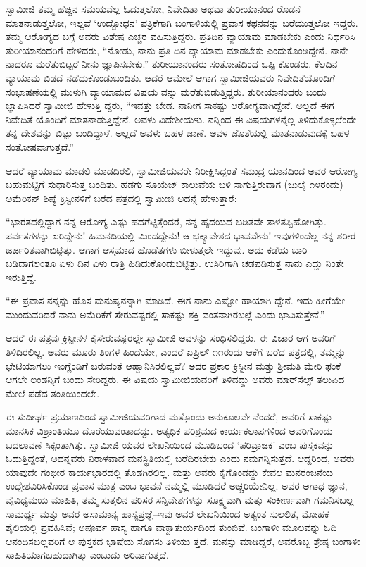ಸ್ವಾಮೀಜಿ ತಮ್ಮ ಹೆಚ್ಚಿನ ಸಮಯವೆಲ್ಲ ಓದುತ್ತಲೋ, ನಿವೇದಿತಾ ಅಥವಾ ತುರೀಯಾನಂದ ರೊಡನೆ ಮಾತನಾಡುತ್ತಲೋ, ಇಲ್ಲವೆ ‘ಉದ್ಬೋಧನ’ ಪತ್ರಿಕೆಗಾಗಿ ಬಂಗಾಳಿಯಲ್ಲಿ ಪ್ರವಾಸ ಕಥನವನ್ನು ಬರೆಯುತ್ತಲೋ ಇದ್ದರು. ತಮ್ಮ ಆರೋಗ್ಯದ ಬಗ್ಗೆ ಅವರು ವಿಶೇಷ ಎಚ್ಚರ ವಹಿಸುತ್ತಿದ್ದರು. ಪ್ರತಿದಿನ ವ್ಯಾಯಾಮ ಮಾಡಬೇಕು ಎಂದು ನಿರ್ಧರಿಸಿ ತುರೀಯಾನಂದರಿಗೆ ಹೇಳಿದರು, “ನೋಡು, ನಾನು ಪ್ರತಿ ದಿನ ವ್ಯಾಯಾಮ ಮಾಡಬೇಕು ಎಂದುಕೊಂಡಿದ್ದೇನೆ. ನಾನೇ ನಾದರೂ ಮರೆತುಬಿಟ್ಟರೆ ನೀನು ಜ್ಞಾಪಿಸಬೇಕು.” ತುರೀಯಾನಂದರು ಸಂತೋಷದಿಂದ ಒಪ್ಪಿ ಕೊಂಡರು. ಕೆಲದಿನ ವ್ಯಾಯಾಮ ಬಿಡದೆ ನಡೆದುಕೊಂಡುಬಂದಿತು. ಆದರೆ ಆಮೇಲೆ ಆಗಾಗ ಸ್ವಾಮೀಜಿಯವರು ನಿವೇದಿತೆಯೊಂದಿಗೆ ಸಂಭಾಷಣೆಯಲ್ಲಿ ಮುಳುಗಿ ವ್ಯಾಯಾಮದ ವಿಷಯ ವನ್ನು ಮರೆತುಬಿಡುತ್ತಿದ್ದರು. ತುರೀಯಾನಂದರು ಬಂದು ಜ್ಞಾಪಿಸಿದರೆ ಸ್ವಾಮೀಜಿ ಹೇಳುತ್ತಿ ದ್ದರು, “ಇವತ್ತು ಬೇಡ. ನಾನೀಗ ಸಾಕಷ್ಟು ಆರೋಗ್ಯವಾಗಿದ್ದೇನೆ. ಅಲ್ಲದೆ ಈಗ ನಿವೇದಿತೆ ಯೊಂದಿಗೆ ಮಾತನಾಡುತ್ತಿದ್ದೇನೆ. ಅವಳು ವಿದೇಶೀಯಳು. ನನ್ನಿಂದ ಈ ವಿಷಯಗಳನ್ನೆಲ್ಲ ತಿಳಿದುಕೊಳ್ಳಲೆಂದೇ ತನ್ನ ದೇಶವನ್ನು ಬಿಟ್ಟು ಬಂದಿದ್ದಾಳೆ. ಅಲ್ಲದೆ ಅವಳು ಬಹಳ ಜಾಣೆ. ಅವಳ ಜೊತೆಯಲ್ಲಿ ಮಾತನಾಡುವುದಕ್ಕೆ ಬಹಳ ಸಂತೋಷವಾಗುತ್ತದೆ.”

ಆದರೆ ವ್ಯಾಯಾಮ ಮಾಡಲಿ ಮಾಡದಿರಲಿ, ಸ್ವಾಮೀಜಿಯವರೇ ನಿರೀಕ್ಷಿಸಿದ್ದಂತೆ ಸಮುದ್ರ ಯಾನದಿಂದ ಅವರ ಆರೋಗ್ಯ ಬಹುಮಟ್ಟಿಗೆ ಸುಧಾರಿಸುತ್ತ ಬಂದಿತು. ಹಡಗು ಸೂಯೆಜ್ ಕಾಲುವೆಯ ಬಳಿ ಸಾಗುತ್ತಿರುವಾಗ (ಜುಲೈ ೧೪ರಂದು) ಅಮೆರಿಕನ್ ಶಿಷ್ಯೆ ಕ್ರಿಸ್ಟೀನಳಿಗೆ ಬರೆದ ಪತ್ರದಲ್ಲಿ ಸ್ವಾಮೀಜಿ ಅದನ್ನೆ ಹೇಳುತ್ತಾರೆ:

“ಭಾರತದಲ್ಲಿದ್ದಾಗ ನನ್ನ ಆರೋಗ್ಯ ಎಷ್ಟು ಹದಗೆಟ್ಟಿತ್ತೆಂದರೆ, ನನ್ನ ಹೃದಯದ ಬಡಿತವೇ ತಾಳತಪ್ಪಿಹೋಗಿತ್ತು. ಪರ್ವತಗಳನ್ನು ಏರಿದ್ದೇನು! ಹಿಮನದಿಯಲ್ಲಿ ಮಿಂದದ್ದೇನು! ಆ ಭಕ್ತ್ಯಾವೇಶದ ಭಾವವೇನು! ಇವುಗಳಿಂದೆಲ್ಲ ನನ್ನ ಶರೀರ ಜರ್ಜರಿತವಾಗಿಬಿಟ್ಟಿತ್ತು. ಆಗಾಗ ಆಸ್ತಮಾದ ಹೊಡೆತಗಳು ಬೀಳುತ್ತಲೇ ಇದ್ದುವು. ಅದು ಕಡೆಯ ಬಾರಿ ಬಡಿದಾಗಲಂತೂ ಏಳು ದಿನ ಏಳು ರಾತ್ರಿ ಹಿಡಿದುಕೊಂಡುಬಿಟ್ಟಿತ್ತು. ಉಸಿರಿಗಾಗಿ ಚಡಪಡಿಸುತ್ತ ನಾನು ಎದ್ದು ನಿಂತೇ ಇರುತ್ತಿದ್ದೆ.

“ಈ ಪ್ರವಾಸ ನನ್ನನ್ನು ಹೊಸ ಮನುಷ್ಯನನ್ನಾಗಿ ಮಾಡಿದೆ. ಈಗ ನಾನು ಎಷ್ಟೋ ಹಾಯಾಗಿ ದ್ದೇನೆ. ಇದು ಹೀಗೆಯೇ ಮುಂದುವರಿದರೆ ನಾನು ಅಮೆರಿಕೆಗೆ ಸೇರುವಷ್ಟರಲ್ಲಿ ಸಾಕಷ್ಟು ಶಕ್ತಿ ವಂತನಾಗಿರಬಲ್ಲೆ ಎಂದು ಭಾವಿಸುತ್ತೇನೆ.”

ಆದರೆ ಈ ಪತ್ರವು ಕ್ರಿಸ್ಟೀನಳ ಕೈಸೇರುವಷ್ಟರಲ್ಲೇ ಸ್ವಾಮೀಜಿ ಅವಳನ್ನು ಸಂಧಿಸಲಿದ್ದರು. ಈ ವಿಚಾರ ಆಗ ಅವರಿಗೆ ತಿಳಿದಿರಲಿಲ್ಲ. ಅವರು ಮೂರು ತಿಂಗಳ ಹಿಂದೆಯೇ, ಎಂದರೆ ಏಪ್ರಿಲ್ ೧೧ರಂದು ಆಕೆಗೆ ಬರೆದ ಪತ್ರದಲ್ಲಿ, ತಮ್ಮನ್ನು ಭೇಟಿಯಾಗಲು ಇಂಗ್ಲೆಂಡಿಗೆ ಬರುವಂತೆ ಆಹ್ವಾನಿಸಿರಲಿಲ್ಲವೆ? ಅದರ ಪ್ರಕಾರ ಕ್ರಿಸ್ಟೀನ ಮತ್ತು ಶ್ರೀಮತಿ ಮೇರಿ ಫಂಕೆ ಆಗಲೇ ಲಂಡನ್ನಿಗೆ ಬಂದು ಸೇರಿದ್ದರು. ಈ ವಿಷಯ ಸ್ವಾಮೀಜಿಯವರಿಗೆ ತಿಳಿದದ್ದು ಅವರು ಮಾರ್​ಸೆಲ್ಸ್ ತಲುಪಿದ ಮೇಲೆ ಪಡೆದ ತಂತಿಯಿಂದಲೇ.

ಈ ಸುದೀರ್ಘ ಪ್ರಯಾಣದಿಂದ ಸ್ವಾಮೀಜಿಯವರಿಗಾದ ಮತ್ತೊಂದು ಅನುಕೂಲವೇ ನೆಂದರೆ, ಅವರಿಗೆ ಸಾಕಷ್ಟು ಮಾನಸಿಕ ವಿಶ್ರಾಂತಿಯೂ ದೊರೆಯುವಂತಾದದ್ದು. ಅತ್ಯಧಿಕ ಪರಿಶ್ರಮದ ಕಾರ್ಯಕಲಾಪಗಳಿಂದ ಅವರಿಗೊಂದು ಬದಲಾವಣೆ ಸಿಕ್ಕಂತಾಗಿತ್ತು. ಸ್ವಾಮೀಜಿ ಯವರ ಲೇಖನಿಯಿಂದ ಮೂಡಿಬಂದ ‘ಪರಿವ್ರಾಜಕ’ ಎಂಬ ಪುಸ್ತಕವನ್ನು ಓದುತ್ತಿದ್ದಂತೆ, ಅದನ್ನವರು ನಿರಾಳವಾದ ಮನಸ್ಥಿತಿಯಲ್ಲಿ ಬರೆದಿರಬೇಕು ಎಂದು ನಮಗನ್ನಿಸುತ್ತದೆ. ಆದ್ದರಿಂದ, ಅವರು ಯಾವುದೇ ಗಂಭೀರ ಕಾರ್ಯಭಾರದಲ್ಲಿ ತೊಡಗಿರಲಿಲ್ಲ. ಮತ್ತು ಅವರು ಕೈಗೊಂಡದ್ದು ಕೇವಲ ಮನರಂಜನೆಯ ಉದ್ದೇಶವಿರಿಸಿಕೊಂಡ ಪ್ರವಾಸ ಮಾತ್ರ ಎಂಬ ಭಾವನೆ ನಮ್ಮಲ್ಲಿ ಮೂಡಿದರೆ ಅಚ್ಚರಿಯೇನಿಲ್ಲ. ಅವರ ಅಗಾಧ ಜ್ಞಾನ, ವೈವಿಧ್ಯಮಯ ಮಾಹಿತಿ, ತಮ್ಮ ಸುತ್ತಲಿನ ಪರಿಸರ-ಸನ್ನಿವೇಶಗಳನ್ನು ಸೂಕ್ಷ್ಮವಾಗಿ ಮತ್ತು ಸಂಕೀರ್ಣವಾಗಿ ಗಮನಿಸಬಲ್ಲ ಸಾಮರ್ಥ್ಯ ಮತ್ತು ಅವರ ಅಸಾಮಾನ್ಯ ಹಾಸ್ಯಪ್ರಜ್ಞೆ–ಇವು ಅವರ ಲೇಖನಿಯಿಂದ ಅತ್ಯಂತ ಸುಲಲಿತ, ಮೋಹಕ ಶೈಲಿಯಲ್ಲಿ ಪ್ರವಹಿಸಿವೆ; ಅಪೂರ್ವ ಹಾಸ್ಯ ಹಾಗೂ ವಾಕ್ಚಾತುರ್ಯದಿಂದ ತುಂಬಿವೆ. ಬಂಗಾಳೀ ಮೂಲವನ್ನು ಓದಿ ಆನಂದಿಸಬಲ್ಲವರಿಗೆ ಆ ಪುಸ್ತಕದ ಭಾಷೆಯ ಸೊಗಸು ತಿಳಿಯು ತ್ತದೆ. ಮನಸ್ಸು ಮಾಡಿದ್ದರೆ, ಅವರೊಬ್ಬ ಶ್ರೇಷ್ಠ ಬಂಗಾಳೀ ಸಾಹಿತಿಯಾಗಬಹುದಾಗಿತ್ತು ಎಂಬುದು ಅರಿವಾಗುತ್ತದೆ.

